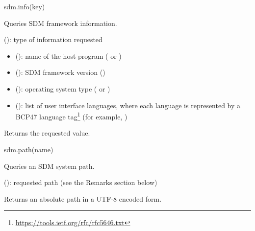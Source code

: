 \documentclass[a4paper,12pt,twoside,extrafontsizes]{memoir}
\begin{document}

\begin{luafuncprototype}
sdm.info(key)
\end{luafuncprototype}

\begin{funcdescr}
	Queries SDM framework information.
\end{funcdescr}

\begin{funcparams}
	 (): type of information requested
	\begin{itemize}
		\item {} (): name of the host program ( or )
		\item {} (): SDM framework version ()
		\item {} (): operating system type ( or )
		\item {} (): list of user interface languages, where each language is represented by a BCP47 language tag\footnote{\url{https://tools.ietf.org/rfc/rfc5646.txt}} (for example, )
	\end{itemize}
\end{funcparams}

\begin{funcret}
	Returns the requested value.
\end{funcret}


\begin{luafuncprototype}
	sdm.path(name)
\end{luafuncprototype}

\begin{funcdescr}
	Queries an SDM system path.
\end{funcdescr}

\begin{funcparams}
	 (): requested path (see the Remarks section below)
\end{funcparams}

\begin{funcret}
	Returns an absolute path in a UTF-8 encoded form.
\end{funcret}
\end{document}
